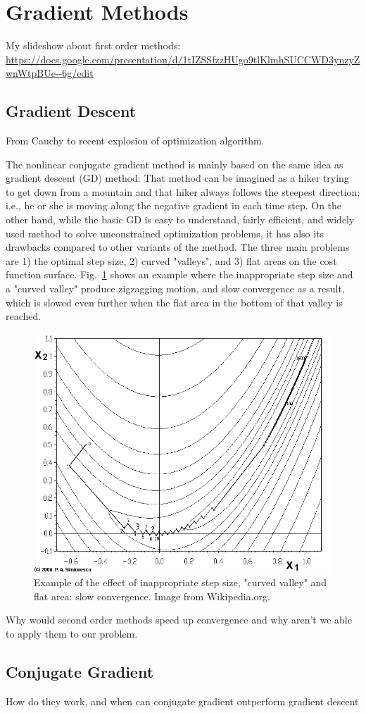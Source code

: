 \section{Gradient Methods}

My slideshow about first order methods: \url{https://docs.google.com/presentation/d/1tIZSSfzzHUgo9tlKlmhSUCCWD3ynzyZwnWtpBUe--6g/edit}

\subsection{Gradient Descent}
From Cauchy to recent explosion of optimization algorithm.

The nonlinear conjugate gradient method is mainly based on the same idea as gradient descent (GD) method: That method can be imagined as a hiker trying to get down from a mountain and that hiker always follows the steepest direction; i.e., he or she is moving along the negative gradient in each time step. On the other hand, while the basic GD is easy to understand, fairly efficient, and widely used method to solve unconstrained optimization problems, it has also its drawbacks compared to other variants of the method. The three main problems are 1) the optimal step size, 2) curved "valleys", and 3) flat areas on the cost function surface. Fig.~\ref{fig:grad_desc_problem} shows an example where the inappropriate step size and a "curved valley" produce zigzagging motion, and slow convergence as a result, which is slowed even further when the flat area in the bottom of that valley is reached.

\begin{figure}
    \centering
    \includegraphics[width=0.3\linewidth]{images/project with Wiem/Banana-SteepDesc.png}
    \caption{Example of the effect of inappropriate step size, "curved valley" and flat area: slow convergence. Image from Wikipedia.org.}
    \label{fig:grad_desc_problem}
\end{figure}

Why would second order methods speed up convergence and why aren't we able to apply them to our problem.

\subsection{Conjugate Gradient}
How do they work, and when can conjugate gradient outperform gradient descent

